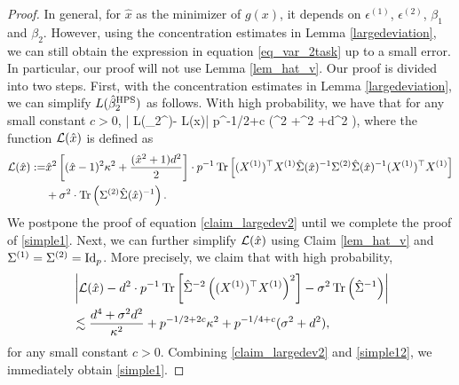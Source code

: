 \begin{proof}
In general, for $\hat x$ as  the minimizer of $g(x)$, it depends on $\epsilon^{(1)}$, $\epsilon^{(2)}$, $\beta_1$ and $\beta_2$. However, using the concentration estimates in Lemma \ref{largedeviation}, we can still obtain the expression in equation \eqref{eq_var_2task} up to a small error. In particular, our proof will not use Lemma \ref{lem_hat_v}.
\fi
Our proof is divided into two steps. First, with the concentration estimates in Lemma \ref{largedeviation}, we can simplify $L(\hat{\beta}_2^{\MTL})$ as follows. With high probability, we have that for any small constant $c>0$,
\be\label{claim_largedev2} \left| L(\hat{\beta}_2^{\MTL})- \cal L(\hat x)\right| \le p^{-1/2+c} \left(\sigma^2 +\kappa^2 +d^2 \right),
\ee
where the function $\cal L(\hat x)$ is defined as
\begin{align*}
	\cal L(\hat x)	:=  &\hat x^2\left[(\hat x-1)^2 \kappa^2 + \frac{(\hat x^2+1)d^2}2\right] \cdot p^{-1}\bigtr{ (X^{(1)})^{\top}X^{(1)} \hat\Sigma(\hat x)^{-1} \Sigma^{(2)} \hat\Sigma(\hat x)^{-1} (X^{(1)})^{\top}X^{(1)} } \\
	& +\sigma^2\cdot \tr\left(\Sigma^{(2)}\hat \Sigma(\hat x)^{-1}\right).
\end{align*}
We postpone the proof of equation \eqref{claim_largedev2} until we complete the proof of \eqref{simple1}. Next, we can further simplify $\cal L(\hat x)$ using Claim \ref{lem_hat_v} and $\Sigma^{(1)}=\Sigma^{(2)}=\id_p$.
More precisely, we claim that with high probability,
\begin{align}
&\left|\cal L(\hat x)- d^2\cdot {p}^{-1}\tr\left[\hat\Sigma^{-2} \left((X^{(1)})^\top X^{(1)} \right)^2\right] -\sigma^2  \tr\left({\hat \Sigma^{-1}  }\right)\right| \nonumber\\
&\lesssim  \frac{d^4 + \sigma^2 d^2}{\kappa^2}+p^{-1/2+2c}\kappa^2 +  p^{-1/4+c} (\sigma^2 +d^2) , \label{simple12}
\end{align}
for any small constant $c>0$. Combining \eqref{claim_largedev2} and \eqref{simple12}, we immediately obtain \eqref{simple1}. %


\end{proof}
